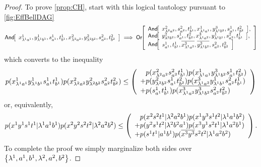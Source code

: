 \begin{proof}
To prove \cref{prop:CH}, start with this logical tautology pursuant to \cref{fig:EffBellDAG}
\begin{align}\begin{split}
\NamedFunction{And}{ x^1_{\lambda ^1 a^1} , y^1_{\lambda ^1 b^1} , s^1_{a^1} , t^1_{b^1} , x^2_{\lambda ^2 a^2} , y^2_{\lambda ^2 b^2} , s^2_{a^2} , t^2_{b^2} }
\implies 
\NamedFunction{Or}{
    \NamedFunction{And}{ x^2_{\lambda ^2 a^2} , s^2_{a^2} , t^1_{b^1} , x^1_{\lambda ^1 a^1} , y^3_{\lambda ^1 b^2} , s^1_{a^1} , t^2_{b^2} } ,\\
    \NamedFunction{And}{ y^2_{\lambda ^2 b^2} , s^1_{a^1} , t^2_{b^2} , x^3_{\lambda ^1 a^2} , y^1_{\lambda ^1 b^1} , s^2_{a^2} , t^1_{b^1} } ,\\
    \NamedFunction{And}{ s^1_{a^1} , t^1_{b^1} , \n{x^3_{\lambda ^1 a^2}} , \n{y^3_{\lambda ^1 b^2}} , s^2_{a^2} , t^2_{b^2} } 
}
\end{split}\end{align}
which converts to the inequality
\begin{align}\begin{split}\label{eq:bellstructineq}
p\lparen x^1_{\lambda ^1 a^1} y^1_{\lambda ^1 b^1} s^1_{a^1} t^1_{b^1}\rparen p\lparen x^2_{\lambda ^2 a^2} y^2_{\lambda ^2 b^2} s^2_{a^2} t^2_{b^2}\rparen
\leq
\left\lparen\begin{array}{l}
\hphantom{+}p\lparen x^2_{\lambda ^2 a^2} s^2_{a^2} t^1_{b^1}\rparen p\lparen x^1_{\lambda ^1 a^1} y^3_{\lambda ^1 b^2} s^1_{a^1} t^2_{b^2}\rparen
\\+p\lparen y^2_{\lambda ^2 b^2} s^1_{a^1} t^2_{b^2}\rparen p\lparen x^3_{\lambda ^1 a^2} y^1_{\lambda ^1 b^1} s^2_{a^2} t^1_{b^1}\rparen
\\+p\lparen s^1_{a^1} t^1_{b^1}\rparen p\lparen\overline{x^3_{\lambda ^1 a^2}} \overline{y^3_{\lambda ^1 b^2}} s^2_{a^2} t^2_{b^2}\rparen
\end{array}\right\rparen
\end{split}\end{align}
or, equivalently,
\begin{align}
\p{x^1 y^1 s^1 t^1|\lambda ^1 a^1 b^1} \p{x^2 y^2 s^2 t^2|\lambda ^2 a^2 b^2}
\leq
\lparens{
\hphantom{+}\p{x^2 s^2 t^1|\lambda ^2 a^2 b^1} \p{x^1 y^3 s^1 t^2|\lambda ^1 a^1 b^2}
\\+\p{y^2 s^1 t^2|\lambda ^2 b^2 a^1} \p{x^3 y^1 s^2 t^1|\lambda ^1 a^2 b^1}
\\+\p{s^1 t^1|a^1 b^1} \p{\n{x^3} \n{y^3} s^2 t^2|\lambda ^1 a^2 b^2}
}\,.
\end{align}
To complete the proof we simply marginalize both sides over $\left\lbrace\lambda ^1, a^1, b^1,\lambda ^2, a^2, b^2\right\rbrace$.\end{proof}


